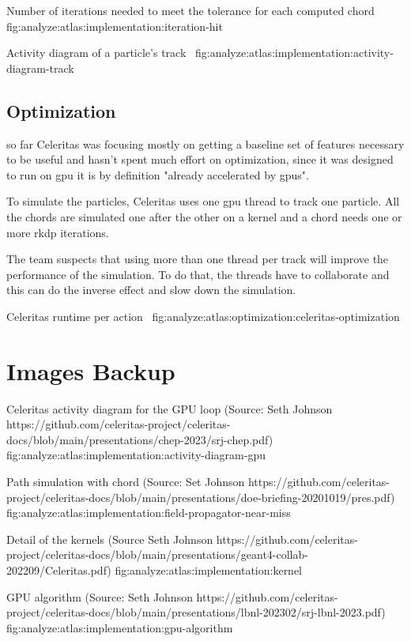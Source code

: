 {Number of iterations needed to meet the tolerance for each computed chord}
{fig:analyze:atlas:implementation:iteration-hit}

{Activity diagram of a particle's track~\cite{atlas-week-esseiva}}
{fig:analyze:atlas:implementation:activity-diagram-track}

\subsection{Optimization}
\label{ch:analyze:atlas:optimization}

so far Celeritas was focusing mostly on getting a baseline set of features
necessary to be useful and hasn't spent much effort on optimization, since it
was designed to run on \acrshort{gpu} it is by definition "already accelerated
by \acrshort{gpu}s".

To simulate the particles, Celeritas uses one \acrshort{gpu} thread to track one particle.
All the chords are simulated one after the other on a kernel and a chord needs
one or more \acrshort{rkdp} iterations.

The team suspects that using more than one thread per track will improve the
performance of the simulation.
To do that, the threads have to collaborate and this can do the inverse effect
and slow down the simulation.

{Celeritas runtime per action~\cite{chep2023-presentation-johnson}}
{fig:analyze:atlas:optimization:celeritas-optimization}


\section{Images Backup}
\label{ch:analyze:images}

{Celeritas activity diagram for the GPU loop (Source: Seth Johnson https://github.com/celeritas-project/celeritas-docs/blob/main/presentations/chep-2023/srj-chep.pdf)}
{fig:analyze:atlas:implementation:activity-diagram-gpu}

{Path simulation with chord (Source: Set Johnson https://github.com/celeritas-project/celeritas-docs/blob/main/presentations/doe-briefing-20201019/pres.pdf)}
{fig:analyze:atlas:implementation:field-propagator-near-miss}

{Detail of the kernels (Source Seth Johnson https://github.com/celeritas-project/celeritas-docs/blob/main/presentations/geant4-collab-202209/Celeritas.pdf)}
{fig:analyze:atlas:implementation:kernel}

{GPU algorithm (Source: Seth Johnson https://github.com/celeritas-project/celeritas-docs/blob/main/presentations/lbnl-202302/srj-lbnl-2023.pdf)}
{fig:analyze:atlas:implementation:gpu-algorithm}
